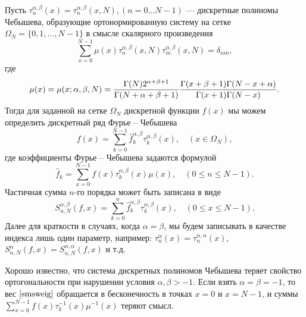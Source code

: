 Пусть $\tau_{n}^{\alpha,\beta}(x) = \tau_{n}^{\alpha,\beta}(x,N), (n=0 \ldots N-1)$ --- дискретные полиномы Чебышева, образующие ортонормированную систему на сетке $\Omega_N = \{0,1,\ldots,N-1 \}$ в смысле скалярного произведения
\begin{equation} \sum_{x=0}^{N-1}\mu(x)\tau_n^{\alpha,\beta}(x,N)
\tau_m^{\alpha,\beta}(x,N)=\delta_{nm},
\end{equation}
где
\begin{equation}\label{smsweig}
 \mu(x)=\mu(x;\alpha,\beta,N)={\Gamma(N)2^{\alpha+\beta+1} \over
\Gamma(N+\alpha+\beta+1)}{\Gamma(x+\beta+1)
\Gamma(N-x+\alpha)\over \Gamma(x+1)\Gamma(N-x)}.
\end{equation}
Тогда для заданной на сетке $\Omega_N$ дискретной функции $f(x)$ мы можем определить дискретный ряд Фурье -- Чебышева
\begin{equation}
\label{sms2eq1}
f(x)=\sum\limits_{k=0}^{N-1}\hat{f}^{\alpha,\beta}_k\tau_{k}^{\alpha,\beta}(x),\quad (x \in \Omega_N),
\end{equation}
где коэффициенты Фурье -- Чебышева задаются формулой
\begin{equation}
\label{sms2eq2}
\hat{f}_k = \sum\limits_{x=0}^{N-1}f(x)\tau_{k}^{\alpha,\beta}(x)\mu(x),\quad (0\le n\le N-1).
\end{equation}
Частичная сумма $n$-го порядка может быть записана в виде
\begin{equation}
\label{sms2eq5}
S_{n,N}^{\alpha,\beta}(f,x) = \sum\limits_{k=0}^{n}\hat{f}^{\alpha,\beta}_k \tau_{k}^{\alpha,\beta}(x),\quad (0\le x\le N-1).
\end{equation}
Далее для краткости в случаях, когда $\alpha = \beta$, мы будем записывать в качестве индекса лишь один параметр, например: $\tau_{n}^{\alpha}(x) = \tau_{n}^{\alpha,\alpha}(x)$, $S_{n,N}^{\alpha}(f,x) = S_{n,N}^{\alpha,\alpha}(f,x)$ и т.д.

Хорошо известно, что система дискретных полиномов Чебышева теряет свойство ортогональности при нарушении условия $\alpha, \beta > -1$.
Если взять $\alpha = \beta = -1$, то вес $\eqref{smsweig}$ обращается в бесконечность в точках $x=0$ и $x=N-1$, и суммы $\sum\limits_{x=0}^{N-1} f(x)\tau_{k}^{-1}(x)\mu^{-1}(x)$ теряют смысл.

